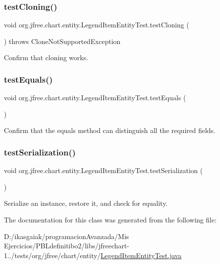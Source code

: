 \subsubsection{\texorpdfstring{test\+Cloning()}{testCloning()}}
{\footnotesize\ttfamily void org.\+jfree.\+chart.\+entity.\+Legend\+Item\+Entity\+Test.\+test\+Cloning (\begin{DoxyParamCaption}{ }\end{DoxyParamCaption}) throws Clone\+Not\+Supported\+Exception}

Confirm that cloning works. \mbox{\label{classorg_1_1jfree_1_1chart_1_1entity_1_1_legend_item_entity_test_a9ba295c277d8aa1443c3b39cd4821b50}} 
\subsubsection{\texorpdfstring{test\+Equals()}{testEquals()}}
{\footnotesize\ttfamily void org.\+jfree.\+chart.\+entity.\+Legend\+Item\+Entity\+Test.\+test\+Equals (\begin{DoxyParamCaption}{ }\end{DoxyParamCaption})}

Confirm that the equals method can distinguish all the required fields. \mbox{\label{classorg_1_1jfree_1_1chart_1_1entity_1_1_legend_item_entity_test_afd41b28ca3276c0a5ec17d4db0507b8c}} 
\subsubsection{\texorpdfstring{test\+Serialization()}{testSerialization()}}
{\footnotesize\ttfamily void org.\+jfree.\+chart.\+entity.\+Legend\+Item\+Entity\+Test.\+test\+Serialization (\begin{DoxyParamCaption}{ }\end{DoxyParamCaption})}

Serialize an instance, restore it, and check for equality. 

The documentation for this class was generated from the following file\+:\begin{DoxyCompactItemize}
\item 
D\+:/ikasgaiak/programacion\+Avanzada/\+Mis Ejercicios/\+P\+B\+Ldefinitibo2/libs/jfreechart-\/1../tests/org/jfree/chart/entity/\mbox{\hyperlink{_legend_item_entity_test_8java}{Legend\+Item\+Entity\+Test.\+java}}\end{DoxyCompactItemize}

